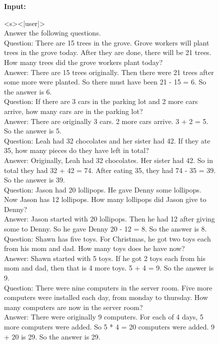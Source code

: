 \documentclass{article}
\begin{document}
\begin{figure}[htbp]
\hrulefill

\textbf{Input:}

\hrulefill

<s><|user|>\\
Answer the following questions.\\
Question: There are 15 trees in the grove. Grove workers will plant trees in the grove today. After they are done, there will be 21 trees. How many trees did the grove workers plant today?\\
Answer: There are 15 trees originally. Then there were 21 trees after some more were planted. So there must have been 21 - 15 = 6. So the answer is 6.\\

Question: If there are 3 cars in the parking lot and 2 more cars arrive, how many cars are in the parking lot?\\
Answer: There are originally 3 cars. 2 more cars arrive. 3 + 2 = 5. So the answer is 5.\\

Question: Leah had 32 chocolates and her sister had 42. If they ate 35, how many pieces do they have left in total?\\
Answer: Originally, Leah had 32 chocolates. Her sister had 42. So in total they had 32 + 42 = 74. After eating 35, they had 74 - 35 = 39. So the answer is 39.\\

Question: Jason had 20 lollipops. He gave Denny some lollipops. Now Jason has 12 lollipops. How many lollipops did Jason give to Denny?\\
Answer: Jason started with 20 lollipops. Then he had 12 after giving some to Denny. So he gave Denny 20 - 12 = 8. So the answer is 8.\\

Question: Shawn has five toys. For Christmas, he got two toys each from his mom and dad. How many toys does he have now?\\
Answer: Shawn started with 5 toys. If he got 2 toys each from his mom and dad, then that is 4 more toys. 5 + 4 = 9. So the answer is 9.\\

Question: There were nine computers in the server room. Five more computers were installed each day, from monday to thursday. How many computers are now in the server room?\\
Answer: There were originally 9 computers. For each of 4 days, 5 more computers were added. So 5 * 4 = 20 computers were added. 9 + 20 is 29. So the answer is 29.\\


\end{figure}
\end{document}
